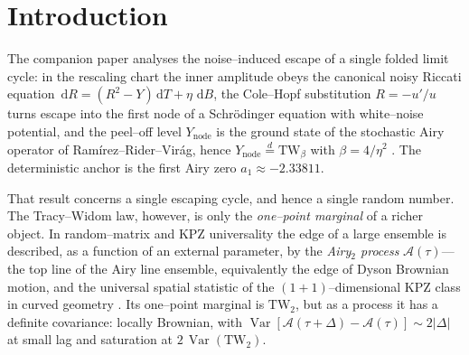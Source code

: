 \documentclass[11pt,reqno]{amsart}
\theoremstyle{plain}
\theoremstyle{definition}
\theoremstyle{remark}
\newcommand{\dd}{\,\mathrm{d}}
\newcommand{\eqd}{\stackrel{d}{=}}
\newcommand{\TW}{\mathrm{TW}}
\newcommand{\Var}{\operatorname{Var}}
\begin{document}
\section{Introduction}\label{sec:intro}

The companion paper analyses the noise--induced escape of a single folded limit cycle: in
the rescaling chart the inner amplitude obeys the canonical noisy Riccati equation
$\dd R=(R^2-Y)\dd T+\eta\,\dd B$, the Cole--Hopf substitution $R=-u'/u$ turns escape into
the first node of a Schr\"odinger equation with white--noise potential, and the peel--off
level $Y_{\mathrm{node}}$ is the ground state of the stochastic Airy operator of
Ram\'irez--Rider--Vir\'ag, hence $Y_{\mathrm{node}}\eqd\TW_\beta$ with $\beta=4/\eta^2$
\cite{paper,RRV}. The deterministic anchor is the first Airy zero $a_1\approx-2.33811$.

That result concerns a single escaping cycle, and hence a single random number. The
Tracy--Widom law, however, is only the \emph{one--point marginal} of a richer object. In
random--matrix and KPZ universality the edge of a large ensemble is described, as a
function of an external parameter, by the \emph{Airy$_2$ process} $\mathcal A(\tau)$---the
top line of the Airy line ensemble, equivalently the edge of Dyson Brownian motion, and the
universal spatial statistic of the $(1{+}1)$--dimensional KPZ class in curved geometry
\cite{Corwin,PrahoferSpohn}. Its one--point marginal is $\TW_2$, but as a process it has a
definite covariance: locally Brownian, with $\Var[\mathcal A(\tau+\Delta)-\mathcal
A(\tau)]\sim 2|\Delta|$ at small lag and saturation at $2\,\Var(\TW_2)$.
\end{document}
